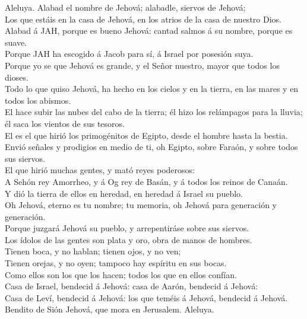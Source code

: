  Aleluya. Alabad el nombre de Jehová; alabadle, siervos de
Jehová;\\
 Los que estáis en la casa de Jehová, en los atrios de la
casa de nuestro Dios.\\
 Alabad á JAH, porque es bueno Jehová: cantad salmos á su
nombre, porque es suave.\\
 Porque JAH ha escogido á Jacob para sí, á Israel por
posesión suya.\\
 Porque yo se que Jehová es grande, y el Señor nuestro,
mayor que todos los dioses.\\
 Todo lo que quiso Jehová, ha hecho en los cielos y en la
tierra, en las mares y en todos los abismos.\\
 El hace subir las nubes del cabo de la tierra; él hizo los
relámpagos para la lluvia; él saca los vientos de sus tesoros.\\
 El es el que hirió los primogénitos de Egipto, desde el
hombre hasta la bestia.\\
 Envió señales y prodigios en medio de ti, oh Egipto, sobre
Faraón, y sobre todos sus siervos.\\
 El que hirió muchas gentes, y mató reyes poderosos:\\
 A Sehón rey Amorrheo, y á Og rey de Basán, y á todos los
reinos de Canaán.\\
 Y dió la tierra de ellos en heredad, en heredad á Israel
su pueblo.\\
 Oh Jehová, eterno es tu nombre; tu memoria, oh Jehová para
generación y generación.\\
 Porque juzgará Jehová su pueblo, y arrepentiráse sobre sus
siervos.\\
 Los ídolos de las gentes son plata y oro, obra de manos de
hombres.\\
 Tienen boca, y no hablan; tienen ojos, y no ven;\\
 Tienen orejas, y no oyen; tampoco hay espíritu en sus
bocas.\\
 Como ellos son los que los hacen; todos los que en ellos
confían.\\
 Casa de Israel, bendecid á Jehová: casa de Aarón, bendecid
á Jehová:\\
 Casa de Leví, bendecid á Jehová: los que teméis á Jehová,
bendecid á Jehová.\\
 Bendito de Sión Jehová, que mora en Jerusalem. Aleluya.

